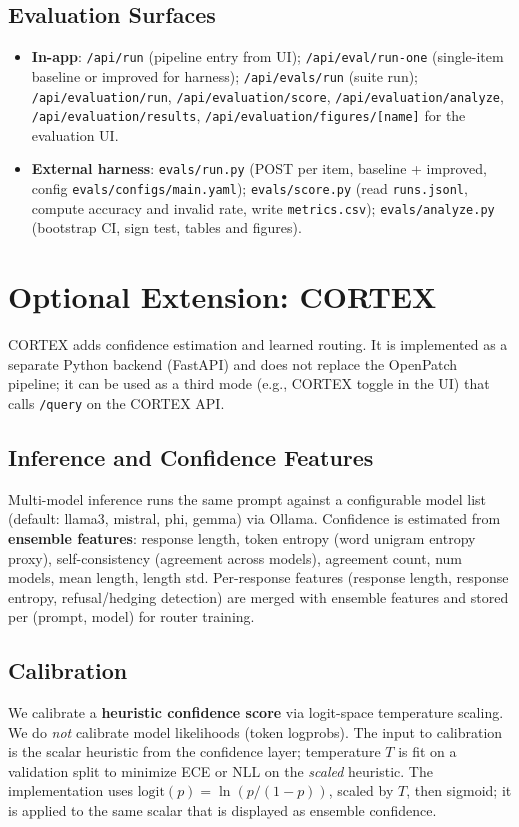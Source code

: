 \documentclass[11pt]{article}
\begin{document}
\subsection{Evaluation Surfaces}
\begin{itemize}
  \item \textbf{In-app}: \texttt{/api/run} (pipeline entry from UI); \texttt{/api/eval/run-one} (single-item baseline or improved for harness); \texttt{/api/evals/run} (suite run); \texttt{/api/evaluation/run}, \texttt{/api/evaluation/score}, \texttt{/api/evaluation/analyze}, \texttt{/api/evaluation/results}, \texttt{/api/evaluation/figures/[name]} for the evaluation UI.
  \item \textbf{External harness}: \texttt{evals/run.py} (POST per item, baseline + improved, config \texttt{evals/configs/main.yaml}); \texttt{evals/score.py} (read \texttt{runs.jsonl}, compute accuracy and invalid rate, write \texttt{metrics.csv}); \texttt{evals/analyze.py} (bootstrap CI, sign test, tables and figures).
\end{itemize}

\section{Optional Extension: CORTEX}
\label{sec:cortex}

CORTEX adds confidence estimation and learned routing. It is implemented as a separate Python backend (FastAPI) and does not replace the OpenPatch pipeline; it can be used as a third mode (e.g., CORTEX toggle in the UI) that calls \texttt{/query} on the CORTEX API.

\subsection{Inference and Confidence Features}
Multi-model inference runs the same prompt against a configurable model list (default: llama3, mistral, phi, gemma) via Ollama. Confidence is estimated from \textbf{ensemble features}: response length, token entropy (word unigram entropy proxy), self-consistency (agreement across models), agreement count, num models, mean length, length std. Per-response features (response length, response entropy, refusal/hedging detection) are merged with ensemble features and stored per (prompt, model) for router training.

\subsection{Calibration}
We calibrate a \textbf{heuristic confidence score} via logit-space temperature scaling. We do \emph{not} calibrate model likelihoods (token logprobs). The input to calibration is the scalar heuristic from the confidence layer; temperature $T$ is fit on a validation split to minimize ECE or NLL on the \emph{scaled} heuristic. The implementation uses $\mathrm{logit}(p) = \ln(p/(1-p))$, scaled by $T$, then sigmoid; it is applied to the same scalar that is displayed as ensemble confidence.
\end{document}
